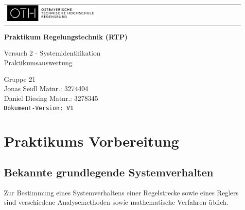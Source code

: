 \documentclass[12pt, oneside, a4paper]{scrreprt}
\begin{document}
\begin{titlepage}
\begin{tabular}{l r} 
\includegraphics[width=0.4\textwidth]{Bilder/oth-regensburg-logo} &
\end{tabular}
   \begin{minipage} [c] [8.5cm] [b] {\textwidth}
      \Huge{
         \begin{center}
            \textbf{Praktikum Regelungstechnik (RTP)}\\[0.8cm]
            \par
            {\large Versuch 2 - Systemidentifikation }\\[1cm]
            {\large Praktikumsauswertung} \\[1cm]
         \end{center}
      }    
   \end{minipage}
   \vspace{0.1cm}
   \begin{minipage} [c] [3.5cm] [b] {\textwidth}
      \begin{center}
         \vspace{0.3cm}
         Gruppe 21\\
         Jonas Seidl Matnr.: 3274404 \\
         Daniel Diesing Matnr.: 3278345\\
         \vspace{0.5cm}
         \texttt{Dokument-Version: V1}\\
	   \end{center}
   \end{minipage}
\end{titlepage}

\newpage
\tableofcontents



\chapter{Praktikums Vorbereitung}
\label{Praktikumsvorbereitung}

\section{Bekannte grundlegende Systemverhalten}
Zur Bestimmung eines Systemverhaltens einer Regelstrecke sowie eines Reglers sind 
verschiedene Analysemethoden sowie mathematische Verfahren üblich.
\end{document}
